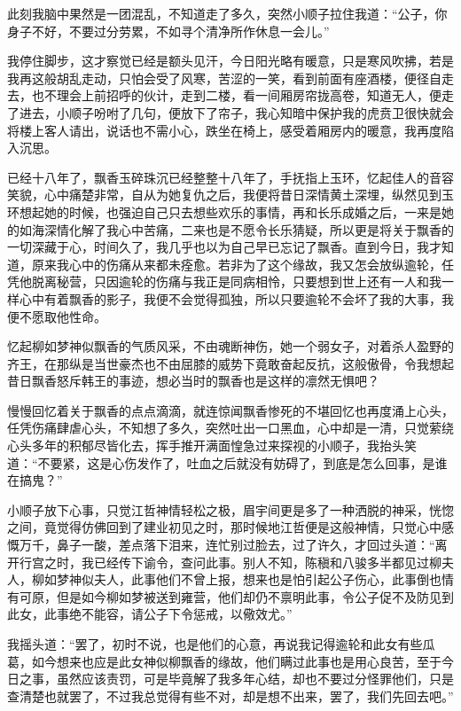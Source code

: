 此刻我脑中果然是一团混乱，不知道走了多久，突然小顺子拉住我道：“公子，你身子不好，不要过分劳累，不如寻个清净所作休息一会儿。”

我停住脚步，这才察觉已经是额头见汗，今日阳光略有暖意，只是寒风吹拂，若是我再这般胡乱走动，只怕会受了风寒，苦涩的一笑，看到前面有座酒楼，便径自走去，也不理会上前招呼的伙计，走到二楼，看一间厢房帘拢高卷，知道无人，便走了进去，小顺子吩咐了几句，便放下了帘子，我心知暗中保护我的虎贲卫很快就会将楼上客人请出，说话也不需小心，跌坐在椅上，感受着厢房内的暖意，我再度陷入沉思。

已经十八年了，飘香玉碎珠沉已经整整十八年了，手抚指上玉环，忆起佳人的音容笑貌，心中痛楚非常，自从为她复仇之后，我便将昔日深情黄土深埋，纵然见到玉环想起她的时候，也强迫自己只去想些欢乐的事情，再和长乐成婚之后，一来是她的如海深情化解了我心中苦痛，二来也是不愿令长乐猜疑，所以更是将关于飘香的一切深藏于心，时间久了，我几乎也以为自己早已忘记了飘香。直到今日，我才知道，原来我心中的伤痛从来都未痊愈。若非为了这个缘故，我又怎会放纵逾轮，任凭他脱离秘营，只因逾轮的伤痛与我正是同病相怜，只要想到世上还有一人和我一样心中有着飘香的影子，我便不会觉得孤独，所以只要逾轮不会坏了我的大事，我便不愿取他性命。

忆起柳如梦神似飘香的气质风采，不由魂断神伤，她一个弱女子，对着杀人盈野的齐王，在那纵是当世豪杰也不由屈膝的威势下竟敢奋起反抗，这般傲骨，令我想起昔日飘香怒斥韩王的事迹，想必当时的飘香也是这样的凛然无惧吧？

慢慢回忆着关于飘香的点点滴滴，就连惊闻飘香惨死的不堪回忆也再度涌上心头，任凭伤痛肆虐心头，不知想了多久，突然吐出一口黑血，心中却是一清，只觉萦绕心头多年的积郁尽皆化去，挥手推开满面惶急过来探视的小顺子，我抬头笑道：“不要紧，这是心伤发作了，吐血之后就没有妨碍了，到底是怎么回事，是谁在搞鬼？”

小顺子放下心事，只觉江哲神情轻松之极，眉宇间更是多了一种洒脱的神采，恍惚之间，竟觉得仿佛回到了建业初见之时，那时候地江哲便是这般神情，只觉心中感慨万千，鼻子一酸，差点落下泪来，连忙别过脸去，过了许久，才回过头道：“离开行宫之时，我已经传下谕令，查问此事。别人不知，陈稹和八骏多半都见过柳夫人，柳如梦神似夫人，此事他们不曾上报，想来也是怕引起公子伤心，此事倒也情有可原，但是如今柳如梦被送到雍营，他们却仍不禀明此事，令公子促不及防见到此女，此事绝不能容，请公子下令惩戒，以儆效尤。”

我摇头道：“罢了，初时不说，也是他们的心意，再说我记得逾轮和此女有些瓜葛，如今想来也应是此女神似柳飘香的缘故，他们瞒过此事也是用心良苦，至于今日之事，虽然应该责罚，可是毕竟解了我多年心结，却也不要过分怪罪他们，只是查清楚也就罢了，不过我总觉得有些不对，却是想不出来，罢了，我们先回去吧。”

